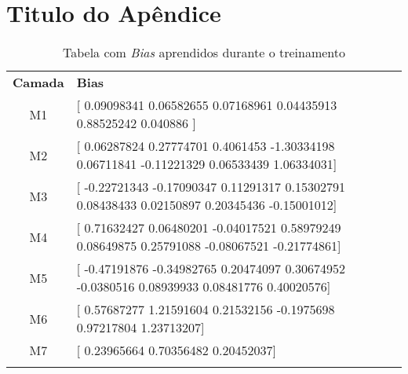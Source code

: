 \chapter{Titulo do Apêndice}

\begin{table}
	\center
	\caption{Tabela com \emph{Bias} aprendidos durante o treinamento}
	\renewcommand{\arraystretch}{1.6}
	\begin{tabular}{c p{8.0cm}}
		\Xhline{6\arrayrulewidth}
		\textbf{Camada} &
			\textbf{Bias} \\
		\Xhline{2\arrayrulewidth}
		M1 & [
			0.09098341  0.06582655 0.07168961  0.04435913  0.88525242
			 0.040886  ] \\
		M2 & [
			0.06287824  0.27774701 0.4061453  -1.30334198 0.06711841
			-0.11221329 0.06533439  1.06334031] \\
		M3 & [
			-0.22721343 -0.17090347 0.11291317 0.15302791 0.08438433
			0.02150897 0.20345436 -0.15001012] \\ 
		M4 & [
			0.71632427 0.06480201 -0.04017521 0.58979249 0.08649875
			0.25791088 -0.08067521 -0.21774861] \\
		M5 & [
			-0.47191876 -0.34982765 0.20474097 0.30674952 -0.0380516
			0.08939933 0.08481776 0.40020576] \\
		M6 & [
			0.57687277 1.21591604 0.21532156 -0.1975698 0.97217804
			1.23713207] \\
		M7 & [
			0.23965664 0.70356482 0.20452037] \\
		
		\Xhline{6\arrayrulewidth}
	\end{tabular}
	\label{tbl:player_fps}
\end{table}

